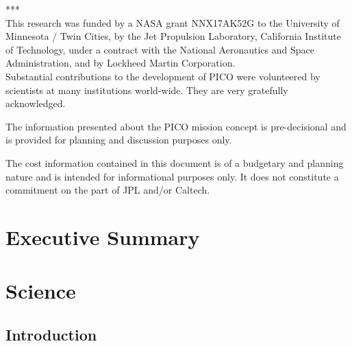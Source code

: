 \documentclass[11pt]{article}
\begin{document}
\begin{centering}
{***}\\
\bigskip
{This research was funded by a NASA grant NNX17AK52G to the University of Minnesota / Twin Cities, by the Jet Propulsion Laboratory, California Institute of Technology, under a contract with the National Aeronautics and Space Administration, and by Lockheed Martin Corporation. \\ Substantial contributions to the development of PICO were volunteered by scientists at many institutions world-wide.  They are very gratefully acknowledged.} \\
\bigskip

{The information presented about the PICO mission concept is pre-decisional and is provided for planning and discussion purposes only.}\\
\bigskip

{The cost information contained in this document is of a budgetary and planning nature and is intended for informational purposes only.  It does not constitute a commitment on the part of JPL and/or Caltech.}\\
\bigskip

\end{centering}
\newpage
{
\hypersetup{linkcolor=black}
\tableofcontents
}
\newpage
{} 
\setcounter{page}{1}
\setcounter{figure}{0}


\section{Executive Summary} %


\section{Science}
\label{sec:science}

\subsection{Introduction} %




\end{document}
